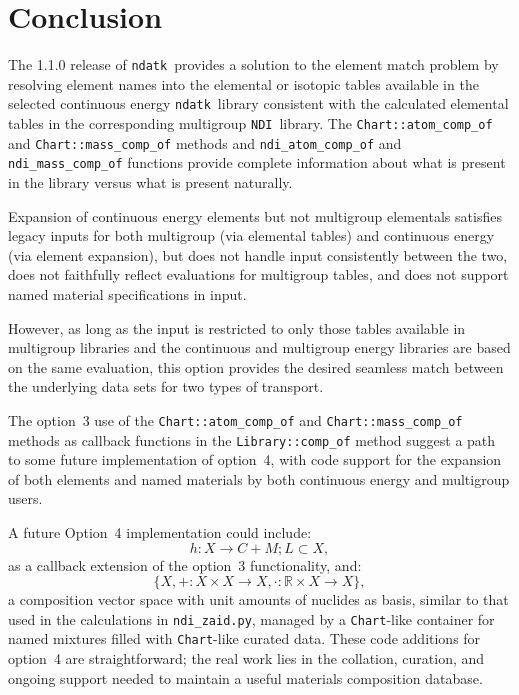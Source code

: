 \documentclass[12pt]{lamemo}
\newcommand{\ndatk}{\texttt{ndatk}}
\newcommand{\NDI}{\texttt{NDI}}
\begin{document}
\section{Conclusion}

The 1.1.0 release of \ndatk\ provides a solution to the element match
problem by resolving element names into the elemental or isotopic
tables available in the selected continuous energy \ndatk\ library
consistent with the calculated elemental tables in the corresponding
multigroup \NDI\ library.  The \texttt{Chart::atom\_comp\_of} and
\texttt{Chart::mass\_comp\_of} methods and
\texttt{ndi\_atom\_comp\_of} and \texttt{ndi\_mass\_comp\_of}
functions provide complete information about what is present in the
library versus what is present naturally.

Expansion of continuous energy elements but not multigroup elementals
satisfies legacy inputs for both multigroup (via elemental tables) and
continuous energy (via element expansion), but does not handle input
consistently between the two, does not faithfully reflect evaluations
for multigroup tables, and does not support named material
specifications in input.

However, as long as the input is restricted to only those tables
available in multigroup libraries and the continuous and multigroup
energy libraries are based on the same evaluation, this option
provides the desired seamless match between the underlying data sets
for two types of transport.

The option~3 use of the \texttt{Chart::atom\_comp\_of} and
\texttt{Chart::mass\_comp\_of} methods as callback functions in the
\texttt{Library::comp\_of} method suggest a path to some future
implementation of option~4, with code support for the expansion of
both elements and named materials by both continuous energy and
multigroup users.
 
A future Option~4 implementation could include:
\[
h:X \rightarrow C+M; L \subset X,
\]
as a callback extension of the option~3 functionality, and:
\[ 
\{X, +:X\times X \rightarrow X, \cdot:\mathbb{R}\times X \rightarrow X \},
\]
a composition vector space with unit amounts of nuclides as basis,
similar to that used in the calculations in \texttt{ndi\_zaid.py},
managed by a \texttt{Chart}-like container for named mixtures filled
with \texttt{Chart}-like curated data.  These code additions for
option~4 are straightforward; the real work lies in the collation,
curation, and ongoing support needed to maintain a useful materials
composition database.
\end{document}
